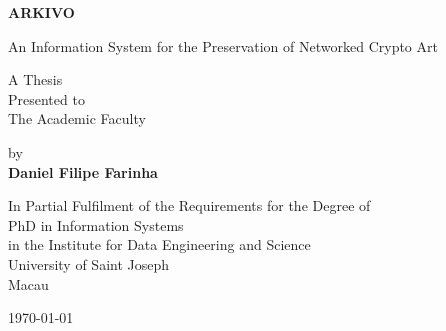 

\begin{titlepage}
    \begin{center}
        \vspace*{1cm}
        
        
        
        \vspace{2cm}
        
        \Huge
        \textbf{ARKIVO}
        
        
        \vspace{0.5cm}
        \LARGE
        An Information System for the Preservation of Networked Crypto Art
        
        \vspace{2cm}

        \normalsize
        A Thesis\\
        Presented to\\
        The Academic Faculty
        
        \vspace{1cm}
        
        by\\
        \textbf{Daniel Filipe Farinha}
        
     
        \vfill
       
        
 
 	\vspace{0.5cm}

        \normalsize
        In Partial Fulfilment of the Requirements for the Degree of \\
        PhD in Information Systems\\
        in the Institute for Data Engineering and Science\\
        University of Saint Joseph\\
        Macau\\
        
        \vspace{1cm}

	\monthyeardate\today
	        
    \end{center}
\end{titlepage}